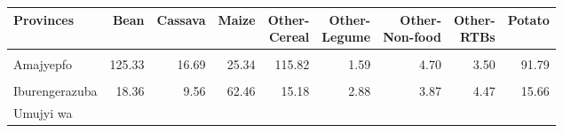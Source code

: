 \begin{table}[!h]
\centering\begingroup\fontsize{7}{9}\selectfont

\begin{tabular}{>{\raggedright\arraybackslash}p{1.8cm}rrrrrrrr}
\toprule
Provinces & Bean & Cassava & Maize & \makecell{Other-\\Cereal} & \makecell{Other-\\Legume} & \makecell{Other-\\Non-food} & \makecell{Other-\\RTBs} & Potato\\
\midrule
\cellcolor{gray!10}{Amajyaruguru} & \cellcolor{gray!10}{124.66} & \cellcolor{gray!10}{5.03} & \cellcolor{gray!10}{72.61} & \cellcolor{gray!10}{29.67} & \cellcolor{gray!10}{2.67} & \cellcolor{gray!10}{11.32} & \cellcolor{gray!10}{3.68} & \cellcolor{gray!10}{27.53}\\
Amajyepfo & 125.33 & 16.69 & 25.34 & 115.82 & 1.59 & 4.70 & 3.50 & 91.79\\
\cellcolor{gray!10}{Iburasirazuba} & \cellcolor{gray!10}{37.96} & \cellcolor{gray!10}{143.45} & \cellcolor{gray!10}{19.67} & \cellcolor{gray!10}{22.34} & \cellcolor{gray!10}{71.59} & \cellcolor{gray!10}{36.79} & \cellcolor{gray!10}{97.00} & \cellcolor{gray!10}{9.47}\\
Iburengerazuba & 18.36 & 9.56 & 62.46 & 15.18 & 2.88 & 3.87 & 4.47 & 15.66\\
Umujyi wa
\cellcolor{gray!10}{Kigali} & \cellcolor{gray!10}{31.90} & \cellcolor{gray!10}{2.93} & \cellcolor{gray!10}{4.72} & \cellcolor{gray!10}{3.03} & \cellcolor{gray!10}{0.36} & \cellcolor{gray!10}{0.26} & \cellcolor{gray!10}{0.16} & \cellcolor{gray!10}{2.39}\\
\bottomrule
\end{tabular}
\endgroup{}
\end{table}
